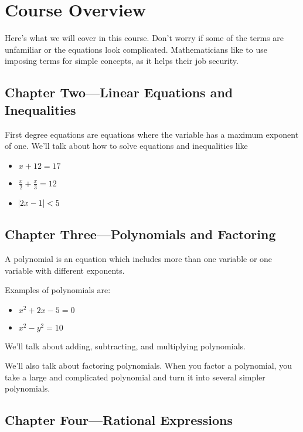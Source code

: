 \documentclass[letterpaper, landscape]{exam}
\begin{document}
    \section{Course Overview}

    Here's what we will cover in this course.  Don't worry if some of the terms are unfamiliar or
    the equations look complicated.  Mathematicians like to use imposing terms for simple concepts,
    as it helps their job security.  

    \subsection{Chapter Two---Linear Equations and Inequalities}

    First degree equations are equations where the variable has a maximum exponent of one.  We'll talk about how to
    solve equations and inequalities like

    \begin{itemize}
        \item $x + 12 = 17 $
        \item $\frac{x}{2} + \frac{x}{3} = 12$
        \item $\abs{2x - 1} < 5$
    \end{itemize}

    \newpage

    \subsection{Chapter Three---Polynomials and Factoring}

    A polynomial is an equation which includes more than one variable or one variable with different
    exponents.  
    
    Examples of polynomials are:
    \begin{itemize}
        \item $x^2 + 2x -5 = 0$
        \item $x^2 - y^2 = 10 $
    \end{itemize}

    We'll talk about adding, subtracting, and multiplying polynomials.

    We'll also talk about factoring polynomials.  When you factor a polynomial, you take a large and
    complicated polynomial and turn it into several simpler polynomials.  

    \subsection{Chapter Four---Rational Expressions}
\end{document}
